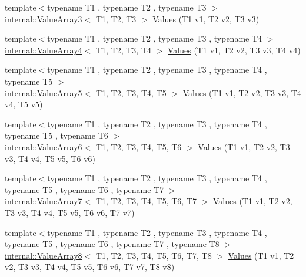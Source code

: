 \begin{DoxyCompactItemize}
\item 
{\footnotesize template$<$typename T1 , typename T2 , typename T3 $>$ }\\\mbox{\hyperlink{classtesting_1_1internal_1_1ValueArray3}{internal\+::\+Value\+Array3}}$<$ T1, T2, T3 $>$ \mbox{\hyperlink{namespacetesting_a344ca3522cb99a7b98801a9577993011}{Values}} (T1 v1, T2 v2, T3 v3)
\item 
{\footnotesize template$<$typename T1 , typename T2 , typename T3 , typename T4 $>$ }\\\mbox{\hyperlink{classtesting_1_1internal_1_1ValueArray4}{internal\+::\+Value\+Array4}}$<$ T1, T2, T3, T4 $>$ \mbox{\hyperlink{namespacetesting_a4b14d4b6e471a1fb8ee3e5706dbc11c6}{Values}} (T1 v1, T2 v2, T3 v3, T4 v4)
\item 
{\footnotesize template$<$typename T1 , typename T2 , typename T3 , typename T4 , typename T5 $>$ }\\\mbox{\hyperlink{classtesting_1_1internal_1_1ValueArray5}{internal\+::\+Value\+Array5}}$<$ T1, T2, T3, T4, T5 $>$ \mbox{\hyperlink{namespacetesting_aa2c5f97a44a14ae95da8313b115b6396}{Values}} (T1 v1, T2 v2, T3 v3, T4 v4, T5 v5)
\item 
{\footnotesize template$<$typename T1 , typename T2 , typename T3 , typename T4 , typename T5 , typename T6 $>$ }\\\mbox{\hyperlink{classtesting_1_1internal_1_1ValueArray6}{internal\+::\+Value\+Array6}}$<$ T1, T2, T3, T4, T5, T6 $>$ \mbox{\hyperlink{namespacetesting_a552772c4c4daa68b5e995e0d64651150}{Values}} (T1 v1, T2 v2, T3 v3, T4 v4, T5 v5, T6 v6)
\item 
{\footnotesize template$<$typename T1 , typename T2 , typename T3 , typename T4 , typename T5 , typename T6 , typename T7 $>$ }\\\mbox{\hyperlink{classtesting_1_1internal_1_1ValueArray7}{internal\+::\+Value\+Array7}}$<$ T1, T2, T3, T4, T5, T6, T7 $>$ \mbox{\hyperlink{namespacetesting_a8fe9ae088304ebc64de1b076951e6eb8}{Values}} (T1 v1, T2 v2, T3 v3, T4 v4, T5 v5, T6 v6, T7 v7)
\item 
{\footnotesize template$<$typename T1 , typename T2 , typename T3 , typename T4 , typename T5 , typename T6 , typename T7 , typename T8 $>$ }\\\mbox{\hyperlink{classtesting_1_1internal_1_1ValueArray8}{internal\+::\+Value\+Array8}}$<$ T1, T2, T3, T4, T5, T6, T7, T8 $>$ \mbox{\hyperlink{namespacetesting_a1eda12e6518e4c51c1bb2e7cc9d31ffa}{Values}} (T1 v1, T2 v2, T3 v3, T4 v4, T5 v5, T6 v6, T7 v7, T8 v8)
\item 

\end{DoxyCompactItemize}
